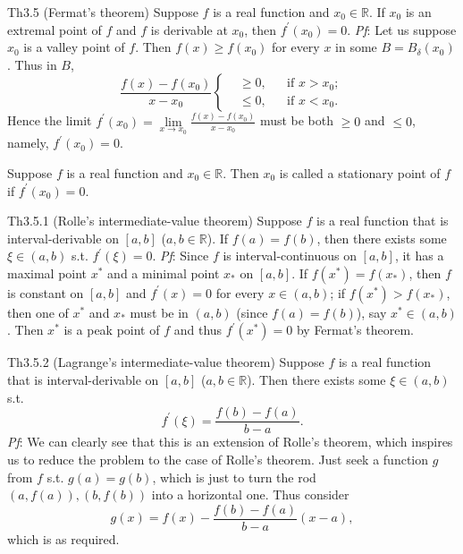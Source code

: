 \documentclass{article}
\begin{document}
\begin{Th}{Th3.5 (Fermat's theorem)}
    Suppose $f$ is a real function and $x_0\in\mathbb{R}$. If $x_0$ is an extremal point of $f$ and $f$ is derivable at $x_0$, then $f^\prime(x_0) = 0$.
    \tcblower
    \textit{Pf}: Let us suppose $x_0$ is a valley point of $f$. Then $f(x)\geq f(x_0)$ for every $x$ in some $B = B_\delta(x_0)$. Thus in $B$, 
    $$ \frac{f(x)-f(x_0)}{x-x_0} \left\{
        \begin{aligned}
            &\geq 0, && \text{if } x>x_0;\\
            &\leq 0, && \text{if } x<x_0.
        \end{aligned}\right.
    $$
    Hence the limit $f^\prime(x_0) = \lim\limits_{x\to x_0} \frac{f(x)-f(x_0)}{x-x_0}$ must be both $\geq 0$ and $\leq 0$, namely, $f^\prime(x_0) = 0$.
\end{Th}

\begin{Rmk}{}
    \textcolor{Df}{Suppose $f$ is a real function and $x_0\in\mathbb{R}$. Then $x_0$ is called a stationary point of $f$ if $f^\prime(x_0) = 0$.}
\end{Rmk}

\begin{Th}{Th3.5.1 (Rolle's intermediate-value theorem)}
    Suppose $f$ is a real function that is interval-derivable on $[a,b]$ ($a,b\in\mathbb{R}$). If $f(a) = f(b)$, then there exists some $\xi \in (a,b)$ s.t. $f^\prime(\xi) = 0$.
    \tcblower
    \textit{Pf}: Since $f$ is interval-continuous on $[a,b]$, it has a maximal point $x^*$ and a minimal point $x_*$ on $[a,b]$. If $f(x^*) = f(x_*)$, then $f$ is constant on $[a,b]$ and $f^\prime(x) = 0$ for every $x\in (a,b)$; if $f(x^*) > f(x_*)$, then one of $x^*$ and $x_*$ must be in $(a,b)$ (since $f(a) = f(b)$), say $x^*\in (a,b)$. Then $x^*$ is a peak point of $f$ and thus $f^\prime(x^*) = 0$ by Fermat's theorem.
\end{Th}

\begin{Th}{Th3.5.2 (Lagrange's intermediate-value theorem)}
    Suppose $f$ is a real function that is interval-derivable on $[a,b]$ ($a,b\in\mathbb{R}$). Then there exists some $\xi\in (a,b)$ s.t.
    $$ f^\prime(\xi) = \frac{f(b)-f(a)}{b-a}. $$
    \tcblower
    \textit{Pf}: We can clearly see that this is an extension of Rolle's theorem, which inspires us to reduce the problem to the case of Rolle's theorem. Just seek a function $g$ from $f$ s.t. $g(a) = g(b)$, which is just to turn the rod $(a, f(a)), (b, f(b))$ into a horizontal one. Thus consider
    $$ g(x) = f(x) - \frac{f(b)-f(a)}{b-a}(x-a), $$
    which is as required. 
\end{Th}
\end{document}

